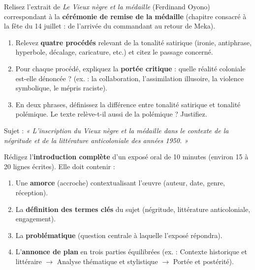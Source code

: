 \documentclass[11pt]{article}
\newcommand{\cle}[1]{{\popxbold\color{popdark}#1}}
\newcounter{popsec}
\newcounter{popsub}
\newcommand{\courssub}[1]{%
  \stepcounter{popsub}%
  \par\vspace{9pt}\noindent{\popxbold\fontsize{11.5}{13}\selectfont\color{popink}{\color{poporange}\thepopsec.\thepopsub}\hspace{6pt}#1}\par\nopagebreak\vspace{4pt}
}
\begin{document}
\begin{exercice}
Relisez l'extrait de \emph{Le Vieux nègre et la médaille} (Ferdinand Oyono) correspondant à la \textbf{cérémonie de remise de la médaille} (chapitre consacré à la fête du 14 juillet : de l'arrivée du commandant au retour de Meka).

\begin{enumerate}
\item Relevez \textbf{quatre procédés} relevant de la \cle{tonalité satirique} (ironie, antiphrase, hyperbole, décalage, caricature, etc.) et citez le passage concerné.
\item Pour chaque procédé, expliquez la \textbf{portée critique} : quelle réalité coloniale est-elle dénoncée ? (ex. : la collaboration, l'assimilation illusoire, la violence symbolique, le mépris raciste).
\item En deux phrases, définissez la différence entre \cle{tonalité satirique} et \cle{tonalité polémique}. Le texte relève-t-il aussi de la polémique ? Justifiez.
\end{enumerate}
\end{exercice}

\begin{exercice}
Sujet : \emph{« L'inscription du Vieux nègre et la médaille dans le contexte de la négritude et de la littérature anticoloniale des années 1950. »}

Rédigez l'\textbf{introduction complète} d'un exposé oral de 10 minutes (environ 15 à 20 lignes écrites). Elle doit contenir :
\begin{enumerate}
\item Une \textbf{amorce} (accroche) contextualisant l'œuvre (auteur, date, genre, réception).
\item La \textbf{définition des termes clés} du sujet (négritude, littérature anticoloniale, engagement).
\item La \textbf{problématique} (question centrale à laquelle l'exposé répondra).
\item L'\textbf{annonce de plan} en trois parties équilibrées (ex. : Contexte historique et littéraire $\to$ Analyse thématique et stylistique $\to$ Portée et postérité).
\end{enumerate}
\end{exercice}

\courssub{Je me prépare au Bac}
\end{document}
